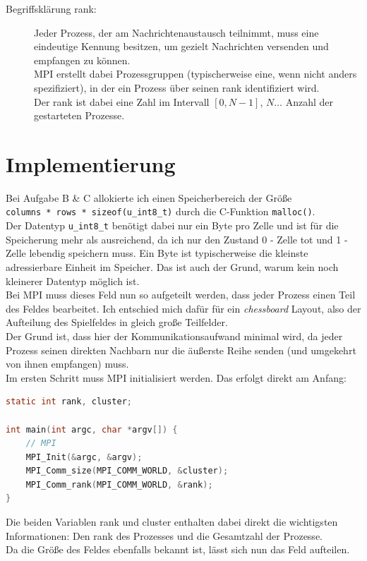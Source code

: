 \documentclass[german,plainarticle,hyperref,utf8]{zihpub}
\begin{document}
	\begin{description}
		\item[Begriffsklärung rank:] Jeder Prozess, der am Nachrichtenaustausch teilnimmt, muss eine eindeutige Kennung besitzen, um gezielt Nachrichten versenden und empfangen zu können.\\ MPI erstellt dabei Prozessgruppen (typischerweise eine, wenn nicht anders spezifiziert), in der ein Prozess über seinen rank identifiziert wird.\\ Der rank ist dabei eine Zahl im Intervall $\left[0, N-1\right]$, $N\dotso$ Anzahl der gestarteten Prozesse.
		
	\end{description}
	\newpage
	\section{Implementierung}
	Bei Aufgabe B \& C allokierte ich einen Speicherbereich der Größe\\ \texttt{columns * rows * sizeof(u\_int8\_t)} durch die C-Funktion \texttt{malloc()}.\\
	Der Datentyp \texttt{u\_int8\_t} benötigt dabei nur ein Byte pro Zelle und ist für die Speicherung mehr als ausreichend, da ich nur den Zustand 0 - Zelle tot und 1 - Zelle lebendig speichern muss. Ein Byte ist typischerweise die kleinste adressierbare Einheit im Speicher. Das ist auch der Grund, warum kein noch kleinerer Datentyp möglich ist.\\
	Bei MPI muss dieses Feld nun so aufgeteilt werden, dass jeder Prozess einen Teil des Feldes bearbeitet. Ich entschied mich dafür für ein \textit{chessboard} Layout, also der Aufteilung des Spielfeldes in gleich große Teilfelder.\\
	Der Grund ist, dass hier der Kommunikationsaufwand minimal wird, da jeder Prozess seinen direkten Nachbarn nur die äußerste Reihe senden (und umgekehrt von ihnen empfangen) muss.\\
	Im ersten Schritt muss MPI initialisiert werden. Das erfolgt direkt am Anfang:
	\begin{lstlisting}[language=C, caption=MPI Initialisierung mit Bestimmung von rank und cluster]
static int rank, cluster;

int main(int argc, char *argv[]) {
	// MPI
	MPI_Init(&argc, &argv);
	MPI_Comm_size(MPI_COMM_WORLD, &cluster);
	MPI_Comm_rank(MPI_COMM_WORLD, &rank);
}\end{lstlisting}

	Die beiden Variablen rank und cluster enthalten dabei direkt die wichtigsten Informationen: Den rank des Prozesses und die Gesamtzahl der Prozesse.\\
	Da die Größe des Feldes ebenfalls bekannt ist, lässt sich nun das Feld aufteilen.\\
	
\end{document}
